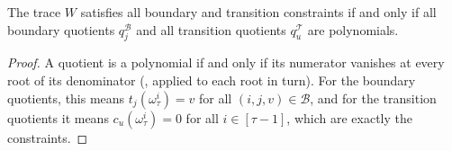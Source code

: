 \documentclass[../../book]{subfiles}
\begin{document}
\begin{proposition}\label{prop:stark-quotients}
  The trace $W$ satisfies all boundary and transition constraints if and only if all boundary quotients $q^{\mathcal{B}}_j$ and all transition quotients $q^{\mathcal{T}}_u$ are polynomials.
\end{proposition}

\begin{proof}
  A quotient is a polynomial if and only if its numerator vanishes at every root of its denominator (, applied to each root in turn).
  For the boundary quotients, this means $t_j(\omega_\tau^i) = v$ for all $(i, j, v) \in \mathcal{B}$, and for the transition quotients it means $c_u(\omega_\tau^i) = 0$ for all $i \in [\tau - 1]$, which are exactly the constraints.
\end{proof}
\end{document}

